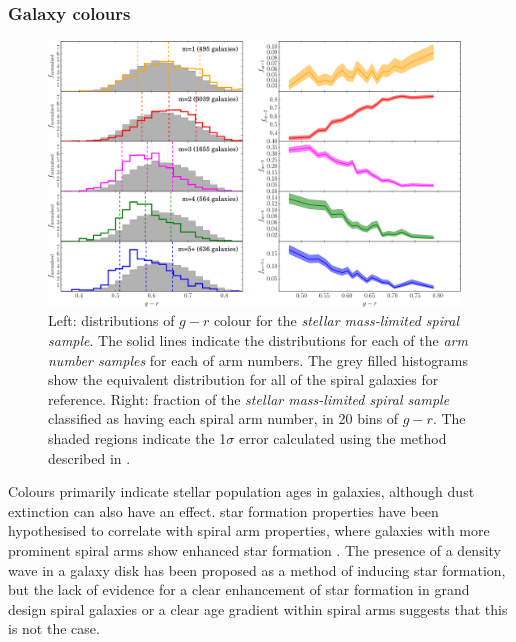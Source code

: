 \documentclass[useAMS,usenatbib]{mn2e}
\begin{document}
\subsubsection{Galaxy colours}
\label{sec:colours}

\begin{figure}
		\centering

        \includegraphics[width=0.975\textwidth]{Images/Results/colour_plots.pdf}

        \caption{Left: distributions of $g-r$ colour for the \textit{stellar mass-limited spiral sample}. The solid lines indicate the distributions for each of the \textit{arm number samples} for each of arm numbers. The grey filled histograms show the equivalent distribution for all of the spiral galaxies for reference. Right: fraction of the \textit{stellar mass-limited spiral sample} classified as having each spiral arm number, in 20 bins of $g-r$. The shaded regions indicate the 1$\sigma$ error calculated using the method described in \citet{Cameron_11}.}

        \label{fig:colour_plots}

\end{figure}

Colours primarily indicate stellar population ages in galaxies, although dust extinction can also have an effect. star formation properties have been hypothesised to correlate with spiral arm properties, where galaxies with more prominent spiral arms show enhanced star formation \citep{Seigar_98,Kendall_15}. The presence of a density wave in a galaxy disk has been proposed as a method of inducing star formation, but the lack of evidence for a clear enhancement of star formation in grand design spiral galaxies \citep{EE_86,Foyle_10,Willett_15} or a clear age gradient within spiral arms \citep{Foyle_11,Dobbs_14,Choi_15} suggests that this is not the case. 
\end{document}
